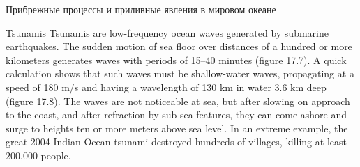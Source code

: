 \begin{chapter}{Прибрежные процессы и приливные явления в мировом океане}
\begin{section}{Tsunamis}
Tsunamis are low-frequency ocean waves
generated by submarine earthquakes. The sudden motion of sea floor
over distances of a hundred or more kilometers generates waves with
periods of 15--40 minutes (figure 17.7). A quick calculation shows
that such waves must be shallow-water waves, propagating at a speed of
180 m/s and having a wavelength of 130 km in water 3.6 km deep (figure
17.8). The waves are not noticeable at sea, but after slowing on
approach to the coast, and after refraction by sub-sea features, they
can come ashore and surge to heights ten or more meters above sea
level. In an extreme example, the great 2004 Indian Ocean
tsunami destroyed hundreds of villages,
killing at least 200,000 people.
%



\end{section}
\end{chapter}
